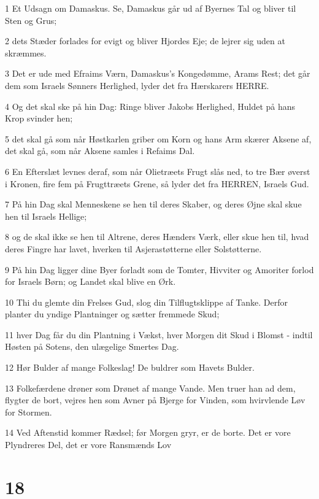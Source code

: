 \par 1 Et Udsagn om Damaskus. Se, Damaskus går ud af Byernes Tal og bliver til Sten og Grus;
\par 2 dets Stæder forlades for evigt og bliver Hjordes Eje; de lejrer sig uden at skræmmes.
\par 3 Det er ude med Efraims Værn, Damaskus's Kongedømme, Arams Rest; det går dem som Israels Sønners Herlighed, lyder det fra Hærskarers HERRE.
\par 4 Og det skal ske på hin Dag: Ringe bliver Jakobs Herlighed, Huldet på hans Krop svinder hen;
\par 5 det skal gå som når Høstkarlen griber om Korn og hans Arm skærer Aksene af, det skal gå, som når Aksene samles i Refaims Dal.
\par 6 En Efterslæt levnes deraf, som når Olietræets Frugt slås ned, to tre Bær øverst i Kronen, fire fem på Frugttræets Grene, så lyder det fra HERREN, Israels Gud.
\par 7 På hin Dag skal Menneskene se hen til deres Skaber, og deres Øjne skal skue hen til Israels Hellige;
\par 8 og de skal ikke se hen til Altrene, deres Hænders Værk, eller skue hen til, hvad deres Fingre har lavet, hverken til Asjerastøtterne eller Solstøtterne.
\par 9 På hin Dag ligger dine Byer forladt som de Tomter, Hivviter og Amoriter forlod for Israels Børn; og Landet skal blive en Ørk.
\par 10 Thi du glemte din Frelses Gud, slog din Tilflugtsklippe af Tanke. Derfor planter du yndige Plantninger og sætter fremmede Skud;
\par 11 hver Dag får du din Plantning i Vækst, hver Morgen dit Skud i Blomst - indtil Høsten på Sotens, den ulægelige Smertes Dag.
\par 12 Hør Bulder af mange Folkeslag! De buldrer som Havets Bulder.
\par 13 Folkefærdene drøner som Drønet af mange Vande. Men truer han ad dem, flygter de bort, vejres hen som Avner på Bjerge for Vinden, som hvirvlende Løv for Stormen.
\par 14 Ved Aftenstid kommer Rædsel; før Morgen gryr, er de borte. Det er vore Plyndreres Del, det er vore Ransmænds Lov

\chapter{18}

